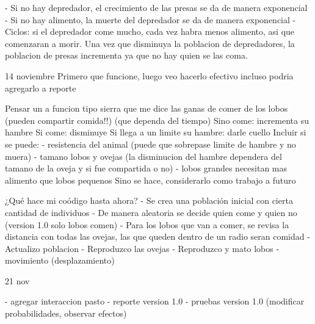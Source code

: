 - Si no hay depredador, el crecimiento de las presas se da de manera exponencial
- Si no hay alimento, la muerte del depredador se da de manera exponencial
- Ciclos: si el depredador come mucho, cada vez habra menos alimento, asi que comenzaran a morir. Una vez que disminuya la poblacion de depredadores, la poblacion de presas incrementa ya que no hay quien se las coma.


14 noviembre
Primero que funcione, luego veo hacerlo efectivo
incluso podria agregarlo a reporte

Pensar un a funcion tipo sierra que me dice las ganas de comer de los lobos (pueden compartir comida!!)
(que dependa del tiempo)
Sino come: incrementa su hambre 
Si come: disminuye
Si llega a un limite su hambre: darle cuello
Incluir si se puede:
- resistencia del animal (puede que sobrepase limite de hambre y no muera)
- tamano lobos y ovejas (la disminucion del hambre dependera del tamano de la oveja y si fue compartida o no)
- lobos grandes necesitan mas alimento que lobos pequenos
Sino se hace, considerarlo como trabajo a futuro

¿Qu\'e hace mi co\'odigo hasta ahora?
- Se crea una poblaci\'on inicial con cierta cantidad de individuos
- De manera aleatoria se decide quien come y quien no (version 1.0 solo lobos comen)
- Para los lobos que van a comer, se revisa la distancia con todas las ovejas, las que queden dentro de un radio seran comidad
- Actualizo poblacion
- Reproduzco las ovejas
- Reproduzco y mato lobos
- movimiento (desplazamiento)


21 nov

- agregar interaccion pasto
- reporte version 1.0
- pruebas version 1.0 (modificar probabilidades, observar efectos)


